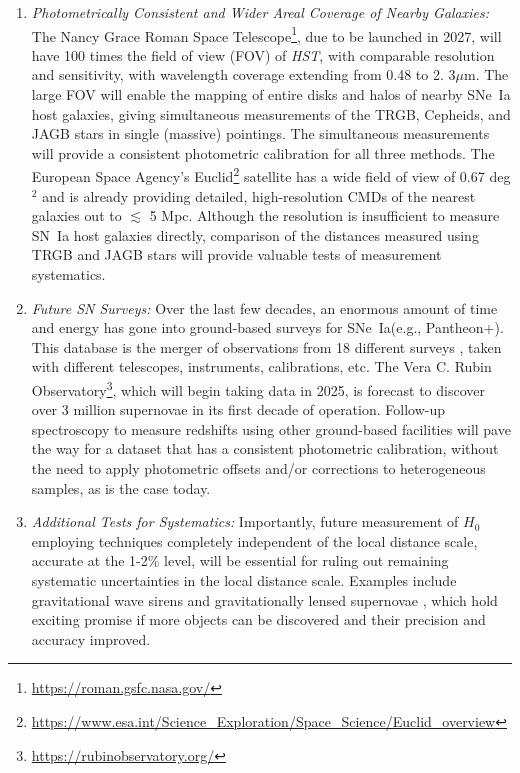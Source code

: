 \documentclass[12pt,modern]{aastex631}
\newcommand{\ho}{$H_{0}$\xspace}
\newcommand{\hst}{\emph{HST}\xspace}
\newcommand{\sne}{SNe~Ia\xspace}
\newcommand{\sn}{SN~Ia\xspace}
\begin{document}
\begin{enumerate}
\item{\it Photometrically Consistent and Wider Areal Coverage of Nearby Galaxies:}  The Nancy Grace Roman Space Telescope\footnote{\url{https://roman.gsfc.nasa.gov/}}, due to be launched in 2027, will have 100 times the field of view (FOV) of \hst, with comparable resolution and sensitivity, with wavelength coverage  extending from 0.48 to 2.  
  3$\mu$m. The large FOV will enable the mapping of entire disks and halos of nearby \sne host galaxies, giving simultaneous measurements of the TRGB, Cepheids, and JAGB stars in single (massive) pointings. The simultaneous measurements will provide a consistent photometric calibration for all three methods. The European Space Agency's Euclid\footnote{\url{https://www.esa.int/Science_Exploration/Space_Science/Euclid_overview}} satellite has a wide field of view of 0.67 deg$^2$ and is already providing detailed, high-resolution CMDs of the nearest galaxies \citep{hunt_2024} out to $\lesssim$ 5 Mpc. Although the resolution is insufficient to measure \sn host galaxies directly, comparison of the distances measured using TRGB and JAGB stars will provide valuable tests of measurement systematics. 

\item{\it Future SN Surveys:} Over the last few decades,  an enormous amount of time and energy has gone into ground-based surveys for \sne (e.g., Pantheon+). This database is the merger of observations from 18 different surveys \citep{scolnic_2022}, taken with different telescopes, instruments, calibrations, etc. The Vera C. Rubin Observatory\footnote{\url{https://rubinobservatory.org/}}, which will begin taking data in 2025, is forecast to discover over 3 million supernovae in its first decade of operation. Follow-up spectroscopy to measure redshifts using other ground-based facilities will pave the way for a dataset that has a consistent photometric calibration, without the need to apply photometric offsets and/or corrections to heterogeneous samples, as is the case today. 

\item{\it Additional Tests for Systematics:} Importantly, future measurement of \ho employing techniques completely independent of the local distance scale,  accurate at the 1-2\% level, will be essential for ruling out  remaining systematic uncertainties in the local distance scale. Examples include gravitational wave sirens \citep[e.g.,][]{chen_fishbach_holz_2018} and gravitationally lensed supernovae \citep[e.g.,][]{grillo_2024}, which hold exciting promise if more objects can be discovered and their precision and accuracy improved.


\end{enumerate}
\end{document}
